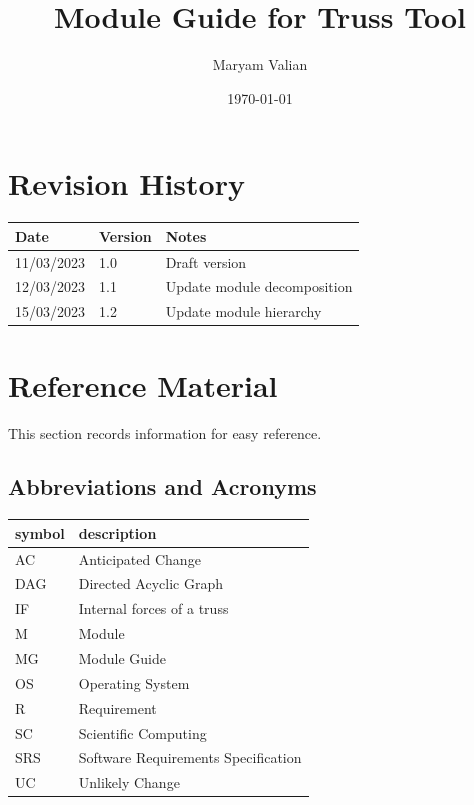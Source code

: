 \documentclass[12pt, titlepage]{article}
\begin{document}
\title{Module Guide for Truss Tool} 
\author{Maryam Valian}
\date{\today}

\maketitle


\section{Revision History}

\begin{tabularx}{\textwidth}{p{3cm}p{2cm}X}
\toprule {\bf Date} & {\bf Version} & {\bf Notes}\\
\midrule
11/03/2023 & 1.0 & Draft version\\
12/03/2023 & 1.1 & Update module decomposition\\
15/03/2023 &1.2 & Update module hierarchy\\
\bottomrule
\end{tabularx}

\newpage

\section{Reference Material}

This section records information for easy reference.

\subsection{Abbreviations and Acronyms}

\renewcommand{\arraystretch}{1.2}
\begin{tabular}{l l} 
  \toprule		
  \textbf{symbol} & \textbf{description}\\
  \midrule 
  AC & Anticipated Change\\
  DAG & Directed Acyclic Graph \\
  IF & Internal forces of a truss\\
  M & Module \\
  MG & Module Guide \\
  OS & Operating System \\
  R & Requirement\\
  SC & Scientific Computing \\
  SRS & Software Requirements Specification\\
  
  UC & Unlikely Change \\
  
  \bottomrule
\end{tabular}\\
\end{document}

